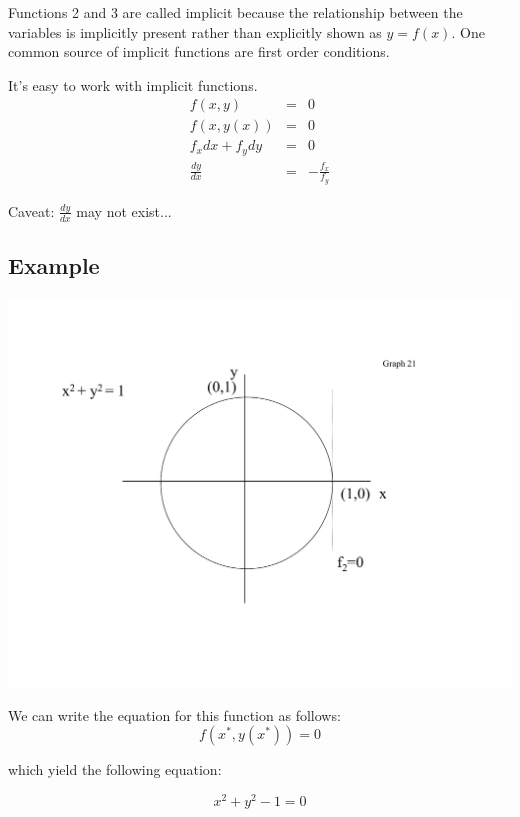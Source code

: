 \documentclass[11pt,english]{article}
\begin{document}
\bigskip

Functions 2 and 3 are called implicit because the relationship between the
variables is implicitly present rather than explicitly shown as $y=f(x)$. One common source of implicit functions are first order conditions.



It's easy to work with implicit functions.%
\begin{eqnarray*}
f(x,y) &=&0\; \\
f(x,y(x)) &=&0 \\
f_{x}dx+f_{y}dy &=&0 \\
\frac{dy}{dx} &=&-\frac{f_{x}}{f_{y}}
\end{eqnarray*}

Caveat: $\frac{dy}{dx}$ may not exist...

\bigskip

\subsection{Example}

\includegraphics[scale=0.6]{math7.pdf}


\bigskip

We can write the equation for this function as follows: 
\begin{equation*}
f(x^{\ast },y(x^{\ast }))=0
\end{equation*}

which yield the following equation:

\begin{equation*}
x^{2}+y^{2}-1=0
\end{equation*}
\end{document}
